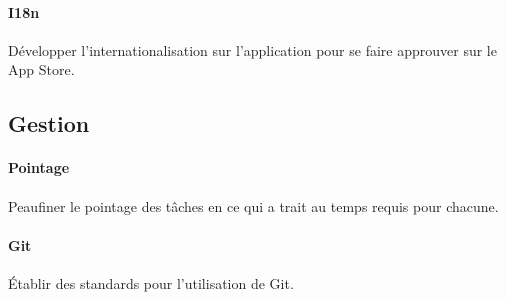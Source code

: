 	\paragraph{I18n} Développer l'internationalisation sur l'application pour se faire approuver sur le App Store.
	
	\subsection{Gestion}
	
	\paragraph{Pointage} Peaufiner le pointage des tâches en ce qui a trait au temps requis pour chacune.
	\paragraph{Git} Établir des standards pour l'utilisation de Git.